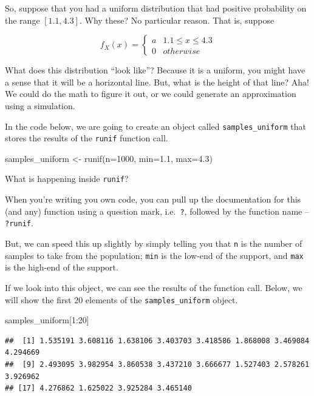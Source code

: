 \documentclass[
]{book}
\newenvironment{Shaded}{\begin{snugshade}}{\end{snugshade}}
\newcommand{\AttributeTok}[1]{\textcolor[rgb]{0.77,0.63,0.00}{#1}}
\newcommand{\DecValTok}[1]{\textcolor[rgb]{0.00,0.00,0.81}{#1}}
\newcommand{\FloatTok}[1]{\textcolor[rgb]{0.00,0.00,0.81}{#1}}
\newcommand{\FunctionTok}[1]{\textcolor[rgb]{0.00,0.00,0.00}{#1}}
\newcommand{\NormalTok}[1]{#1}
\newcommand{\OtherTok}[1]{\textcolor[rgb]{0.56,0.35,0.01}{#1}}
\newcommand{\SpecialCharTok}[1]{\textcolor[rgb]{0.00,0.00,0.00}{#1}}
\theoremstyle{definition}
\theoremstyle{definition}
\theoremstyle{definition}
\theoremstyle{definition}
\theoremstyle{remark}
\begin{document}
So, suppose that you had a uniform distribution that had positive probability on the range \([1.1, 4.3]\). Why these? No particular reason. That is, suppose

\[
  f_{X}(x) = \begin{cases} 
    a & 1.1 \leq x \leq 4.3 \\ 
    0 & otherwise
  \end{cases}
\]

What does this distribution ``look like''? Because it is a uniform, you might have a sense that it will be a horizontal line. But, what is the height of that line? Aha! We could do the math to figure it out, or we could generate an approximation using a simulation.

In the code below, we are going to create an object called \texttt{samples\_uniform} that stores the results of the \texttt{runif} function call.

\begin{Shaded}
\begin{Highlighting}[]
\NormalTok{samples\_uniform }\OtherTok{\textless{}{-}} \FunctionTok{runif}\NormalTok{(}\AttributeTok{n=}\DecValTok{1000}\NormalTok{, }\AttributeTok{min=}\FloatTok{1.1}\NormalTok{, }\AttributeTok{max=}\FloatTok{4.3}\NormalTok{)}
\end{Highlighting}
\end{Shaded}

What is happening inside \texttt{runif}?

When you're writing you own code, you can pull up the documentation for this (and any) function using a question mark, i.e.~\texttt{?}, followed by the function name -- \texttt{?runif}.

But, we can speed this up slightly by simply telling you that \texttt{n} is the number of samples to take from the population; \texttt{min} is the low-end of the support, and \texttt{max} is the high-end of the support.

If we look into this object, we can see the results of the function call. Below, we will show the first \(20\) elements of the \texttt{samples\_uniform} object.

\begin{Shaded}
\begin{Highlighting}[]
\NormalTok{samples\_uniform[}\DecValTok{1}\SpecialCharTok{:}\DecValTok{20}\NormalTok{]}
\end{Highlighting}
\end{Shaded}

\begin{verbatim}
##  [1] 1.535191 3.608116 1.638106 3.403703 3.418586 1.868008 3.469084 4.294669
##  [9] 2.493095 3.982954 3.860538 3.437210 3.666677 1.527403 2.578261 3.926962
## [17] 4.276862 1.625022 3.925284 3.465140
\end{verbatim}
\end{document}
